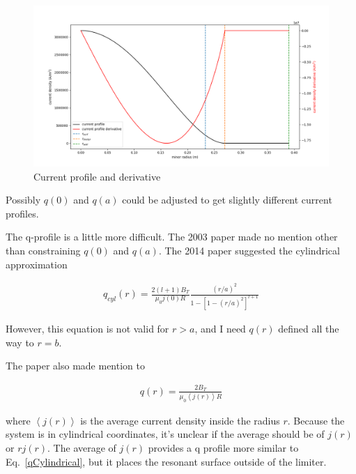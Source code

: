 \documentclass{article}
\begin{document}
\begin{figure}[htb]
	\includegraphics[width=15cm]{images/wessonCurrentProfile.png}
	\caption{Current profile and derivative
		\label{fig:schedule}}    
\end{figure}  

\noindent Possibly $q(0)$ and $q(a)$ could be adjusted to get slightly different current profiles.  


The q-profile is a little more difficult.  The 2003 paper made no mention other than constraining $q(0)$ and $q(a)$.  The 2014 paper suggested the cylindrical approximation

\begin{equation} \label{qCylindrical}
\begin{split}
q_{cyl}(r)=\frac{2(l+1)B_T}{\mu_0 j(0) R} \frac{(r/a)^2}{1-\left[ 1-(r/a)^2\right]^{l+1}}
\end{split} 
\end{equation} 

\noindent However, this equation is not valid for $r>a$, and I need $q(r)$ defined all the way to $r=b$.  

The paper also made mention to 

\begin{equation} \label{qDef}
\begin{split}
q(r)=\frac{2B_T}{\mu_0 \left<j(r)\right> R}
\end{split} 
\end{equation} 

\noindent where $\left<j(r)\right>$ is the average current density inside the radius $r$.  Because the system is in cylindrical coordinates, it's unclear if the average should be of $j(r)$ or $rj(r)$.  The average of $j(r)$ provides a q profile more similar to Eq.~\ref{qCylindrical}, but it places the resonant surface outside of the limiter.  
\end{document}
